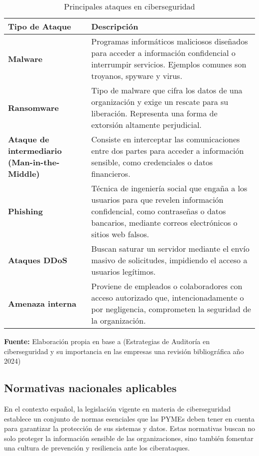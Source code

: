 \documentclass[a4paper, 10pt]{article}
\begin{document}
\begin{table}[H]
    \centering
    \caption{Principales ataques en ciberseguridad}
    \begin{tabular}{p{4cm} p{12cm}}
    \hline
    \textbf{Tipo de Ataque} & \textbf{Descripción} \\
    \hline
    \textbf{Malware} & Programas informáticos maliciosos diseñados para acceder a información confidencial o interrumpir servicios. Ejemplos comunes son troyanos, spyware y virus. \\
    \hline
    \textbf{Ransomware} & Tipo de malware que cifra los datos de una organización y exige un rescate para su liberación. Representa una forma de extorsión altamente perjudicial. \\
    \hline
    \textbf{Ataque de intermediario (Man-in-the-Middle) }& Consiste en interceptar las comunicaciones entre dos partes para acceder a información sensible, como credenciales o datos financieros. \\
    \hline
    \textbf{Phishing} & Técnica de ingeniería social que engaña a los usuarios para que revelen información confidencial, como contraseñas o datos bancarios, mediante correos electrónicos o sitios web falsos. \\
    \hline
    \textbf{Ataques DDoS} & Buscan saturar un servidor mediante el envío masivo de solicitudes, impidiendo el acceso a usuarios legítimos. \\
    \hline
    \textbf{Amenaza interna} & Proviene de empleados o colaboradores con acceso autorizado que, intencionadamente o por negligencia, comprometen la seguridad de la organización. \\
    \hline
    \end{tabular}
    \begin{flushleft}\centering
        \footnotesize \textbf{Fuente:} Elaboración propia en base  a (Estrategias de Auditoría en ciberseguridad y su importancia en las empresas una revisión bibliográfica año 2024)
    \end{flushleft}
    \label{tab:tipos_ataques}
    \end{table}

\subsection{Normativas nacionales aplicables}

    En el contexto español, la legislación vigente en materia de ciberseguridad establece un conjunto de normas esenciales que las PYMEs deben tener en cuenta para garantizar la protección de sus sistemas y datos. Estas normativas buscan no solo proteger la información sensible de las organizaciones, sino también fomentar una cultura de prevención y resiliencia ante los ciberataques.
    \par\vspace{0.5cm}
\end{document}
